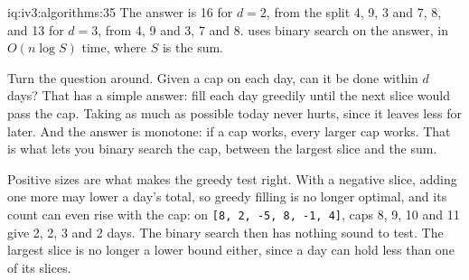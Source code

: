 \begin{solution}{iq:iv3:algorithms:35}
The answer is 16 for $d = 2$, from the split 4, 9, 3 and 7, 8, and 13 for $d = 3$, from 4, 9 and 3, 7 and 8.  uses binary search on the answer, in $O(n \log S)$ time, where $S$ is the sum.
\enlargethispage{-3\baselineskip}%
\label{lst:iv3:al:splitdays}

Turn the question around. Given a cap on each day, can it be done within $d$ days? That has a simple answer: fill each day greedily until the next slice would pass the cap. Taking as much as possible today never hurts, since it leaves less for later. And the answer is monotone: if a cap works, every larger cap works. That is what lets you binary search the cap, between the largest slice and the sum.

Positive sizes are what makes the greedy test right. With a negative slice, adding one more may lower a day's total, so greedy filling is no longer optimal, and its count can even rise with the cap: on \texttt{[8, 2, -5, 8, -1, 4]}, caps 8, 9, 10 and 11 give 2, 2, 3 and 2 days. The binary search then has nothing sound to test. The largest slice is no longer a lower bound either, since a day can hold less than one of its slices.

\end{solution}

